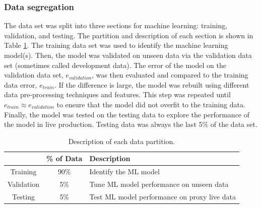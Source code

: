 \subsubsection{Data segregation}
The data set was split into three sections for machine learning: training, validation, and testing.  The partition and description of each section is shown in Table \ref{tab:08datapart}. The training data set was used to identify the machine learning model(s).  Then, the model was validated on unseen data via the validation data set (sometimes called development data).  The error of the model on the validation data set, $e_{validation}$, was then evaluated and compared to the training data error, $e_{train}$.  If the difference is large, the model was rebuilt using different data pre-processing techniques and features. This step was repeated until $e_{train} \approx e_{validation}$ to ensure that the model did not overfit to the training data. Finally, the model was tested on the testing data to explore the performance of the model in live production.  Testing data was always the last 5\% of the data set.
\begin{table}[h]
    \centering
    {
    \begin{tabular}{ c | c | p{9cm}}
                            & \% of Data        &  Description \\
        \hline
        Training            &  90\%             
        &  Identify the ML model        \\
        
        Validation          &  5\%              
        &  Tune ML model performance on unseen data         \\
        
        Testing             &  5\%             
        &  Test ML model performance on proxy live data       \\     
    \end{tabular}}
    \caption{Description of each data partition.}
    \label{tab:08datapart}
\end{table}
